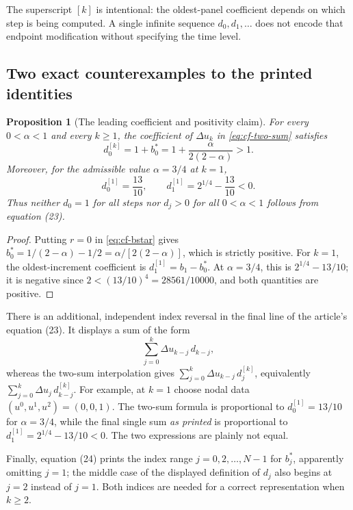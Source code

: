 \documentclass[11pt,a4paper]{amsart}
\theoremstyle{remark}
\theoremstyle{plain}
\newtheorem{proposition}{Proposition}[section]
\theoremstyle{remark}
\numberwithin{equation}{section}
\begin{document}
The superscript $[k]$ is intentional: the oldest-panel coefficient depends on which step is being computed. A single infinite sequence $d_0,d_1,\ldots$ does not encode that endpoint modification without specifying the time level.

\subsection{Two exact counterexamples to the printed identities}
\begin{proposition}[The leading coefficient and positivity claim]
\label{prop:cf-counter}
For every $0<\alpha<1$ and every $k\ge1$, the coefficient of $\Delta u_k$ in \eqref{eq:cf-two-sum} satisfies
\begin{equation}\label{eq:cf-d0}
 d_0^{[k]}=1+b_0^*=1+\frac{\alpha}{2(2-\alpha)}>1.
\end{equation}
Moreover, for the admissible value $\alpha=3/4$ at $k=1$,
\begin{equation}\label{eq:cf-neg}
 d_0^{[1]}=\frac{13}{10},\qquad
 d_1^{[1]}=2^{1/4}-\frac{13}{10}<0.
\end{equation}
Thus neither $d_0=1$ for all steps nor $d_j>0$ for all $0<\alpha<1$ follows from equation (23).
\end{proposition}
\begin{proof}
Putting $r=0$ in \eqref{eq:cf-bstar} gives
$b_0^*=1/(2-\alpha)-1/2=\alpha/[2(2-\alpha)]$, which is strictly positive.
For $k=1$, the oldest-increment coefficient is $d_1^{[1]}=b_1-b_0^*$.
At $\alpha=3/4$, this is $2^{1/4}-13/10$; it is negative since
$2<(13/10)^4=28561/10000$, and both quantities are positive.
\end{proof}

There is an additional, independent index reversal in the final line of the article's equation (23). It displays a sum of the form
\[
 \sum_{j=0}^k \Delta u_{k-j}\,d_{k-j},
\]
whereas the two-sum interpolation gives $\sum_{j=0}^k\Delta u_{k-j}\,d_j^{[k]}$, equivalently $\sum_{j=0}^k\Delta u_j\,d_{k-j}^{[k]}$.
For example, at $k=1$ choose nodal data $(u^0,u^1,u^2)=(0,0,1)$. The two-sum formula is proportional to $d_0^{[1]}=13/10$ for $\alpha=3/4$, while the final single sum \emph{as printed} is proportional to $d_1^{[1]}=2^{1/4}-13/10<0$. The two expressions are plainly not equal.

Finally, equation (24) prints the index range $j=0,2,\ldots,N-1$ for $b_j^*$, apparently omitting $j=1$; the middle case of the displayed definition of $d_j$ also begins at $j=2$ instead of $j=1$. Both indices are needed for a correct representation when $k\ge2$.
\end{document}
